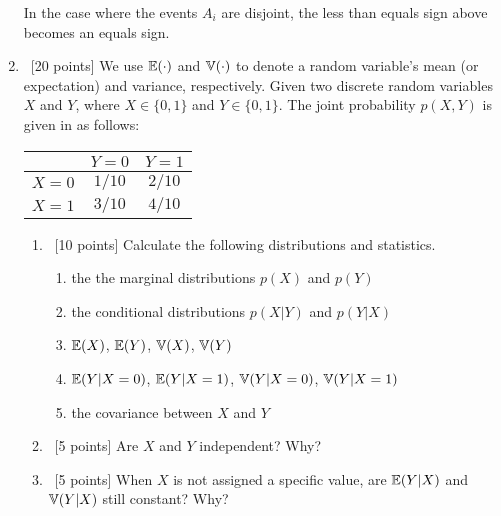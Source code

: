 \documentclass[12pt, fullpage,letterpaper]{article}
\begin{document}
\begin{enumerate}
In the case where the events $A_i$ are disjoint, the less than equals sign above becomes an equals sign. 

\pagebreak



\label{sec:q4}
\item~[20 points]  We use $\mathbb{E}(\cdot)$ and $\mathbb{V}(\cdot)$ to denote a random variable's mean (or expectation) and variance, respectively. Given two discrete random variables $X$ and $Y$, where $X \in \{0, 1\}$ and $Y \in \{0,1\}$. The joint probability $p(X,Y)$ is given in as follows:
\begin{table}[h]
        \centering
        \begin{tabular}{ccc}
        \hline\hline
         & $Y=0$ & $Y=1$ \\ \hline
         $X=0$ & $1/10$ & $2/10$ \\ \hline
         $X=1$  & $3/10$ & $4/10$ \\ \hline\hline
        \end{tabular}
        \end{table}
	
        \begin{enumerate}
            \item~[10 points] Calculate the following distributions and statistics. 
            \begin{enumerate}
            \item the the marginal distributions $p(X)$ and $p(Y)$
            \item the conditional distributions $p(X|Y)$ and $p(Y|X)$
            \item $\mathbb{E}(X)$, $\mathbb{E}(Y)$, $\mathbb{V}(X)$, $\mathbb{V}(Y)$
            \item  $\mathbb{E}(Y|X=0)$, $\mathbb{E}(Y|X=1)$,  $\mathbb{V}(Y|X=0)$, $\mathbb{V}(Y|X=1)$ 
            \item  the covariance between $X$ and $Y$
            \end{enumerate}
            \item~[5 points] Are $X$ and $Y$ independent? Why?
            \item~[5 points] When $X$ is not assigned a specific value, are $\mathbb{E}(Y|X)$ and $\mathbb{V}(Y|X)$ still constant? Why?
        \end{enumerate}
        

\end{enumerate}
\end{document}
